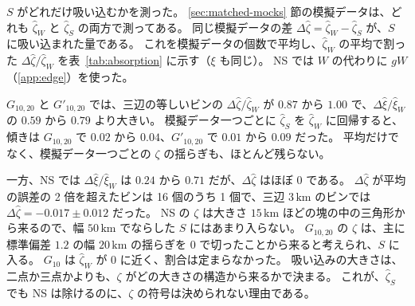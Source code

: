 \documentclass[a4paper,11pt]{ltjsarticle}
\begin{document}
$S$ がどれだけ吸い込むかを測った。
\ref{sec:matched-mocks} 節の模擬データは、どれも $\hat\zeta_W$ と $\hat\zeta_S$ の両方で測ってある。
同じ模擬データの差 $\Delta\hat\zeta = \hat\zeta_W - \hat\zeta_S$ が、$S$ に吸い込まれた量である。
これを模擬データの個数で平均し、$\hat\zeta_W$ の平均で割った $\Delta\hat\zeta/\hat\zeta_W$ を表~\ref{tab:absorption} に示す（$\xi$ も同じ）。
NS では $W$ の代わりに $gW$（\ref{app:edge}）を使った。

\begin{table}[t]
  \centering
  \caption{$S$ に吸い込まれる割合 $\Delta\hat\xi/\hat\xi_W$ と $\Delta\hat\zeta/\hat\zeta_W$（$\Delta\hat\zeta = \hat\zeta_W - \hat\zeta_S$、$\Delta\hat\xi$ も同じ）。分子・分母とも模擬データ $N$ 個の平均。
    $\xi$ は辺のビン、$\zeta$ は三辺の等しいビン。
    $\hat\zeta_W$ の平均が平均の誤差の 2 倍に届かないビンは、割合が定まらないので「—」とした。
    NS の $W$ は $gW$。$G_{10}$ は \ref{sec:matched-mocks} 節の $A = 0.7$、幅 $10\,\mathrm{km}$ の模型。}
  \label{tab:absorption}
  \small
  
\end{table}

$G_{10,20}$ と $G'_{10,20}$ では、三辺の等しいビンの $\Delta\hat\zeta/\hat\zeta_W$ が $0.87$ から $1.00$ で、$\Delta\hat\xi/\hat\xi_W$ の $0.59$ から $0.79$ より大きい。
模擬データ一つごとに $\hat\zeta_S$ を $\hat\zeta_W$ に回帰すると、傾きは $G_{10,20}$ で $0.02$ から $0.04$、$G'_{10,20}$ で $0.01$ から $0.09$ だった。
平均だけでなく、模擬データ一つごとの $\zeta$ の揺らぎも、ほとんど残らない。

一方、NS では $\Delta\hat\xi/\hat\xi_W$ は $0.24$ から $0.71$ だが、$\Delta\hat\zeta$ はほぼ $0$ である。
$\Delta\hat\zeta$ が平均の誤差の 2 倍を超えたビンは 16 個のうち 1 個で、三辺 $3\,\mathrm{km}$ のビンでは $\Delta\hat\zeta = -0.017 \pm 0.012$ だった。
NS の $\zeta$ は大きさ $15\,\mathrm{km}$ ほどの塊の中の三角形から来るので、幅 $50\,\mathrm{km}$ でならした $S$ にはあまり入らない。
$G_{10,20}$ の $\zeta$ は、主に標準偏差 $1.2$ の幅 $20\,\mathrm{km}$ の揺らぎを $0$ で切ったことから来ると考えられ、$S$ に入る。
$G_{10}$ は $\hat\zeta_W$ が $0$ に近く、割合は定まらなかった。
吸い込みの大きさは、二点か三点かよりも、$\zeta$ がどの大きさの構造から来るかで決まる。
これが、$\hat\zeta_S$ でも NS は除けるのに、$\zeta$ の符号は決められない理由である。
\end{document}
